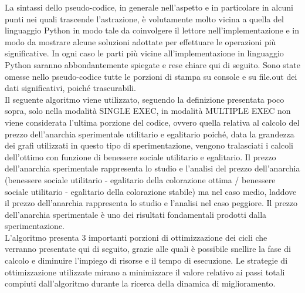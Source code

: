 \newpage
La sintassi dello pseudo-codice, in generale nell'aspetto e in particolare in alcuni punti nei quali trascende l'astrazione, è volutamente molto vicina a quella del linguaggio Python in modo tale da coinvolgere il lettore nell'implementazione e in modo da mostrare alcune soluzioni adottate per effettuare le operazioni più significative. In ogni caso le parti più vicine all'implementazione in linguaggio Python saranno abbondantemente spiegate e rese chiare qui di seguito. Sono state omesse nello pseudo-codice tutte le porzioni di stampa su console e su file.out dei dati significativi, poiché trascurabili.\\
Il seguente algoritmo viene utilizzato, seguendo la definizione presentata poco sopra, solo nella modalità SINGLE EXEC, in modalità MULTIPLE EXEC non viene considerata l'ultima porzione del codice, ovvero quella relativa al calcolo del prezzo dell'anarchia sperimentale utilitario e egalitario poiché, data la grandezza dei grafi utilizzati in questo tipo di sperimentazione, vengono tralasciati i calcoli dell'ottimo con funzione di benessere sociale utilitario e egalitario. Il prezzo dell'anarchia sperimentale rappresenta lo studio e l'analisi del prezzo dell'anarchia (benessere sociale utilitario - egalitario della colorazione ottima / benessere sociale utilitario - egalitario della colorazione stabile) ma nel caso medio, laddove il prezzo dell'anarchia rappresenta lo studio e l'analisi nel caso peggiore. Il prezzo dell'anarchia sperimentale è uno dei risultati fondamentali prodotti dalla sperimentazione.\\
L'algoritmo presenta 3 importanti porzioni di ottimizzazione dei cicli che verranno presentate qui di seguito, grazie alle quali è possibile snellire la fase di calcolo e diminuire l'impiego di risorse e il tempo di esecuzione. Le strategie di ottimizzazione utilizzate mirano a minimizzare il valore relativo ai passi totali compiuti dall'algoritmo durante la ricerca della dinamica di miglioramento.\\
